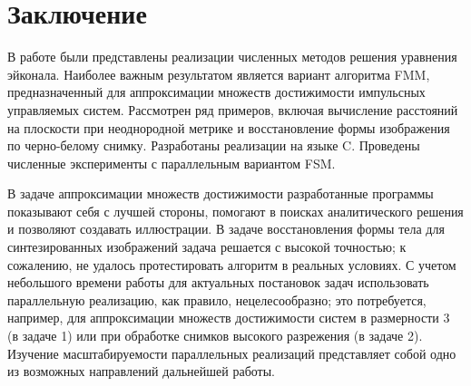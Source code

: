 \section*{Заключение}
\label{sec:conclusion}

В работе были представлены реализации численных методов решения уравнения эйконала. Наиболее важным результатом является вариант алгоритма FMM, 
предназначенный для аппроксимации множеств достижимости импульсных управляемых систем. Рассмотрен ряд примеров, включая вычисление расстояний на плоскости при неоднородной метрике и восстановление формы изображения по черно-белому снимку. Разработаны реализации на языке C. Проведены численные эксперименты с параллельным вариантом FSM. 

В задаче аппроксимации множеств достижимости разработанные программы показывают себя с лучшей стороны, помогают в поисках аналитического решения и позволяют создавать иллюстрации. В задаче восстановления формы тела для синтезированных изображений задача решается с высокой точностью; к сожалению, не удалось протестировать алгоритм в реальных условиях. С учетом небольшого времени работы для актуальных постановок задач использовать параллельную реализацию, как правило, нецелесообразно; это потребуется, например, для аппроксимации множеств достижимости систем в размерности 3 (в задаче 1) или при обработке снимков высокого разрежения (в задаче 2). Изучение масштабируемости параллельных реализаций представляет собой одно из возможных направлений дальнейшей работы.

